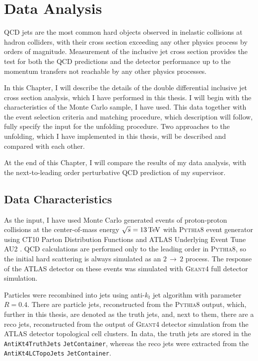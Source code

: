 \chapter{Data Analysis}


QCD jets are the most common hard objects observed in inelastic collisions 
at hadron colliders, with their cross section exceeding any other
physics process by orders of magnitude.  Measurement of the inclusive jet cross
section provides the test for both the QCD predictions and the detector
performance up to the momentum transfers not reachable by any other physics
processes. 

In this Chapter, I will describe the details of the double differential
inclusive jet cross section analysis, which I have performed in this thesis.
I will begin with the characteristics of the Monte Carlo sample, I have used.
This data together with the event selection criteria and matching procedure,
which description will follow, fully specify the input for the unfolding
procedure. Two approaches to the unfolding, which I have implemented in this
thesis, will be described and compared with each other. 

At the end of this Chapter, I will compare the results of my data analysis, with
the next-to-leading order perturbative QCD prediction of my supervisor. 

\section{Data Characteristics}

As the input, I have used Monte Carlo generated events of proton-proton collisions at
the center-of-mass energy $\sqrt{s} = 13\,\text{TeV}$ with \textsc{Pythia8}
\cite{Pythia8} event generator using CT10 Parton Distribution Functions
\cite{CT10PDF} and ATLAS Underlying Event Tune AU2 \cite{AU2}. QCD calculations
are performed only to the leading order in \textsc{Pythia8}, so the initial hard
scattering is always simulated as an $2\,\rightarrow\,2$ process. The response of
the ATLAS detector on these events was simulated with \textsc{Geant4}
\cite{Geant4} full detector simulation.

Particles were recombined into jets using anti-$k_t$ jet algorithm with
parameter $R=0.4$. There are particle jets, reconstructed from the
\textsc{Pythia8} output, which, further in this thesis, are denoted as the truth jets,
and, next to them, there are a reco jets, reconstructed from the output of
\textsc{Geant4} detector simulation from the ATLAS detector topological cell
clusters. In data, the truth jets are stored in the \texttt{AntiKt4TruthJets}
\texttt{JetContainer}, whereas the reco jets were extracted from the \texttt{AntiKt4LCTopoJets}
\texttt{JetContainer}.

